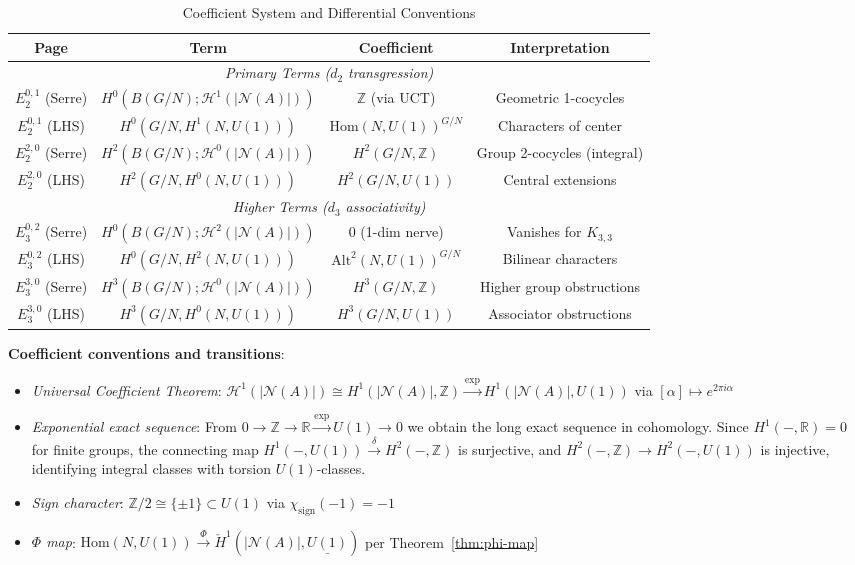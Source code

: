 \documentclass[11pt]{article}
\begin{document}
\begin{table}[h]
\centering
\caption{Coefficient System and Differential Conventions}\label{tab:coefficients}
\begin{tabular}{c|c|c|c}
\toprule
\textbf{Page} & \textbf{Term} & \textbf{Coefficient} & \textbf{Interpretation} \\
\midrule
\multicolumn{4}{c}{\textit{Primary Terms ($d_2$ transgression)}} \\
$E_2^{0,1}$ (Serre) & $H^0(B(G/N); \mathcal{H}^1(|\mathcal{N}(A)|))$ & $\mathbb{Z}$ (via UCT) & Geometric 1-cocycles \\
$E_2^{0,1}$ (LHS) & $H^0(G/N, H^1(N, U(1)))$ & $\mathrm{Hom}(N, U(1))^{G/N}$ & Characters of center \\
$E_2^{2,0}$ (Serre) & $H^2(B(G/N); \mathcal{H}^0(|\mathcal{N}(A)|))$ & $H^2(G/N, \mathbb{Z})$ & Group 2-cocycles (integral) \\
$E_2^{2,0}$ (LHS) & $H^2(G/N, H^0(N, U(1)))$ & $H^2(G/N, U(1))$ & Central extensions \\
\midrule
\multicolumn{4}{c}{\textit{Higher Terms ($d_3$ associativity)}} \\
$E_3^{0,2}$ (Serre) & $H^0(B(G/N); \mathcal{H}^2(|\mathcal{N}(A)|))$ & $0$ (1-dim nerve) & Vanishes for $K_{3,3}$ \\
$E_3^{0,2}$ (LHS) & $H^0(G/N, H^2(N, U(1)))$ & $\mathrm{Alt}^2(N, U(1))^{G/N}$ & Bilinear characters \\
$E_3^{3,0}$ (Serre) & $H^3(B(G/N); \mathcal{H}^0(|\mathcal{N}(A)|))$ & $H^3(G/N, \mathbb{Z})$ & Higher group obstructions \\
$E_3^{3,0}$ (LHS) & $H^3(G/N, H^0(N, U(1)))$ & $H^3(G/N, U(1))$ & Associator obstructions \\
\bottomrule
\end{tabular}

\vspace{0.5em}
\textbf{Coefficient conventions and transitions}:
\begin{itemize}
\item \textit{Universal Coefficient Theorem}: $\mathcal{H}^1(|\mathcal{N}(A)|) \cong H^1(|\mathcal{N}(A)|, \mathbb{Z}) \xrightarrow{\exp} H^1(|\mathcal{N}(A)|, U(1))$ via $[\alpha] \mapsto e^{2\pi i \alpha}$
\item \textit{Exponential exact sequence}: From $0 \to \mathbb{Z} \to \mathbb{R} \xrightarrow{\exp} U(1) \to 0$ we obtain the long exact sequence in cohomology. Since $H^1(-, \mathbb{R}) = 0$ for finite groups, the connecting map $H^1(-, U(1)) \xrightarrow{\delta} H^2(-, \mathbb{Z})$ is surjective, and $H^2(-, \mathbb{Z}) \to H^2(-, U(1))$ is injective, identifying integral classes with torsion $U(1)$-classes.
\item \textit{Sign character}: $\mathbb{Z}/2 \cong \{\pm 1\} \subset U(1)$ via $\chi_{\text{sign}}(-1) = -1$
\item \textit{$\Phi$ map}: $\mathrm{Hom}(N, U(1)) \xrightarrow{\Phi} \check{H}^1(|\mathcal{N}(A)|, \underline{U(1)})$ per Theorem~\ref{thm:phi-map}
\end{itemize}


\end{table}
\end{document}
